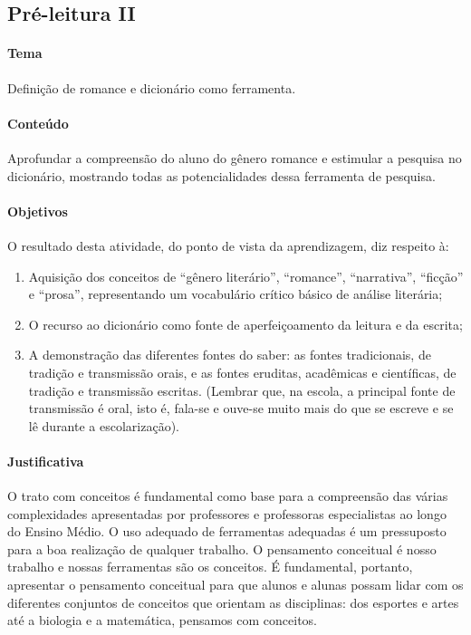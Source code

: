 \documentclass[12pt]{extarticle}
\begin{document}
\subsection{Pré-leitura II}


\paragraph{Tema} Definição de romance e dicionário como ferramenta.


\paragraph{Conteúdo} Aprofundar a compreensão do aluno do gênero romance e estimular a pesquisa no dicionário, mostrando todas as potencialidades dessa ferramenta de pesquisa.


\paragraph{Objetivos}
O resultado desta atividade, do ponto de vista da aprendizagem, diz
respeito à:

\begin{enumerate} 
\item
Aquisição dos conceitos de ``gênero literário'',
``romance'', ``narrativa'', ``ficção'' e ``prosa'', representando um
vocabulário crítico básico de análise literária; 

\item
O recurso ao dicionário como fonte de aperfeiçoamento da leitura e da escrita;

\item
A demonstração das diferentes fontes do saber: as fontes tradicionais, de
tradição e transmissão orais, e as fontes eruditas, acadêmicas e
científicas, de tradição e transmissão escritas. (Lembrar que, na
escola, a principal fonte de transmissão é oral, isto é, fala-se e
ouve-se muito mais do que se escreve e se lê durante a escolarização).
\end{enumerate}

\paragraph{Justificativa}

O trato com conceitos é fundamental como base para a compreensão das
várias complexidades apresentadas por professores e professoras
especialistas ao longo do Ensino Médio. O uso adequado de ferramentas
adequadas é um pressuposto para a boa realização de qualquer trabalho. O
pensamento conceitual é nosso trabalho e nossas ferramentas são os
conceitos. É fundamental, portanto, apresentar o pensamento conceitual
para que alunos e alunas possam lidar com os diferentes conjuntos de
conceitos que orientam as disciplinas: dos esportes e artes até a
biologia e a matemática, pensamos com conceitos.
\end{document}
